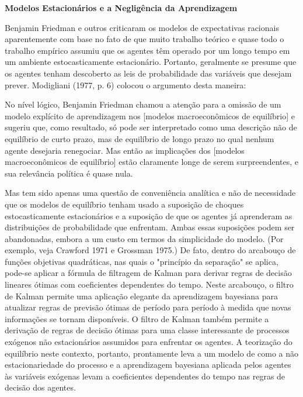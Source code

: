 \documentclass[12pt]{article}
\begin{document}
\textbf{Modelos Estacionários e a Negligência da Aprendizagem}

Benjamin Friedman e outros criticaram os modelos de expectativas racionais aparentemente com base no fato de que muito trabalho teórico e quase todo o trabalho empírico assumiu que os agentes têm operado por um longo tempo em um ambiente estocasticamente estacionário. Portanto, geralmente se presume que os agentes tenham descoberto as leis de probabilidade das variáveis que desejam prever. Modigliani (1977, p. 6) colocou o argumento desta maneira:

No nível lógico, Benjamin Friedman chamou a atenção para a omissão de um modelo explícito de aprendizagem nos [modelos macroeconômicos de equilíbrio] e sugeriu que, como resultado, só pode ser interpretado como uma descrição não de equilíbrio de curto prazo, mas de equilíbrio de longo prazo no qual nenhum agente desejaria renegociar. Mas então as implicações dos [modelos macroeconômicos de equilíbrio] estão claramente longe de serem surpreendentes, e sua relevância política é quase nula.

Mas tem sido apenas uma questão de conveniência analítica e não de necessidade que os modelos de equilíbrio tenham usado a suposição de choques estocasticamente estacionários e a suposição de que os agentes já aprenderam as distribuições de probabilidade que enfrentam. Ambas essas suposições podem ser abandonadas, embora a um custo em termos da simplicidade do modelo. (Por exemplo, veja Crawford 1971 e Grossman 1975.) De fato, dentro do arcabouço de funções objetivas quadráticas, nas quais o "princípio da separação" se aplica, pode-se aplicar a fórmula de filtragem de Kalman para derivar regras de decisão lineares ótimas com coeficientes dependentes do tempo. Neste arcabouço, o filtro de Kalman permite uma aplicação elegante da aprendizagem bayesiana para atualizar regras de previsão ótimas de período para período à medida que novas informações se tornam disponíveis. O filtro de Kalman também permite a derivação de regras de decisão ótimas para uma classe interessante de processos exógenos não estacionários assumidos para enfrentar os agentes. A teorização do equilíbrio neste contexto, portanto, prontamente leva a um modelo de como a não estacionariedade do processo e a aprendizagem bayesiana aplicada pelos agentes às variáveis exógenas levam a coeficientes dependentes do tempo nas regras de decisão dos agentes.
\end{document}
